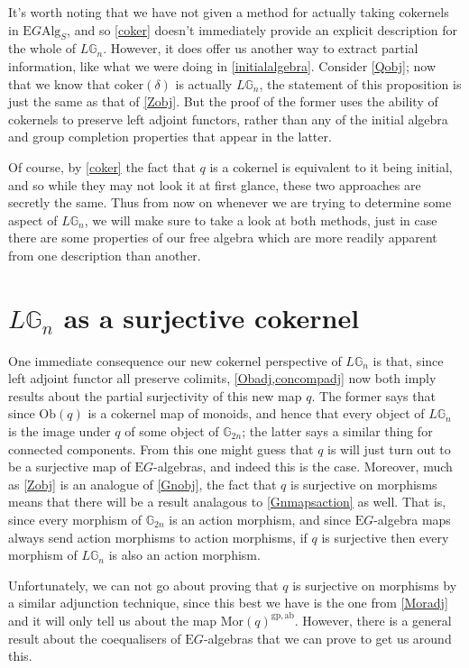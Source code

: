 It's worth noting that we have not given a method for actually taking cokernels in $\mathrm{E}G\mathrm{Alg}_S$, and so \cref{coker} doesn't immediately provide an explicit description for the whole of $L\mathbb{G}_n$. However, it does offer us another way to extract partial information, like what we were doing in \cref{initialalgebra}. Consider \cref{Qobj}; now that we know that $\mathrm{coker}(\delta)$ is actually $L\mathbb{G}_n$, the statement of this proposition is just the same as that of \cref{Zobj}. But the proof of the former uses the ability of cokernels to preserve left adjoint functors, rather than any of the initial algebra and group completion properties that appear in the latter.

Of course, by \cref{coker} the fact that $q$ is a cokernel is equivalent to it being initial, and so while they may not look it at first glance, these two approaches are secretly the same. Thus from now on whenever we are trying to determine some aspect of $L\mathbb{G}_n$, we will make sure to take a look at both methods, just in case there are some properties of our free algebra which are more readily apparent from one description than another.

\section{$L\mathbb{G}_n$ as a surjective cokernel}

One immediate consequence our new cokernel perspective of $L\mathbb{G}_n$ is that, since left adjoint functor all preserve colimits, \cref{Obadj,concompadj} now both imply results about the partial surjectivity of this new map $q$. The former says that since $\mathrm{Ob}(q)$ is a cokernel map of monoids, and hence that every object of $L\mathbb{G}_n$ is the image under $q$ of some object of $\mathbb{G}_{2n}$; the latter says a similar thing for connected components. From this one might guess that $q$ is will just turn out to be a surjective map of $\mathrm{E}G$-algebras, and indeed this is the case. Moreover, much as \cref{Zobj} is an analogue of \cref{Gnobj}, the fact that $q$ is surjective on morphisms means that there will be a result analagous to \cref{Gnmapsaction} as well. That is, since every morphism of $\mathbb{G}_{2n}$ is an action morphism, and since $\mathrm{E}G$-algebra maps always send action morphisms to action morphisms, if $q$ is surjective then every morphism of $L\mathbb{G}_n$ is also an action morphism. 

Unfortunately, we can not go about proving that $q$ is surjective on morphisms by a similar adjunction technique, since this best we have is the one from \cref{Moradj} and it will only tell us about the map $\mathrm{Mor}(q)^{\mathrm{gp}, \mathrm{ab}}$. However, there is a general result about the coequalisers of $\mathrm{E}G$-algebras that we can prove to get us around this.

